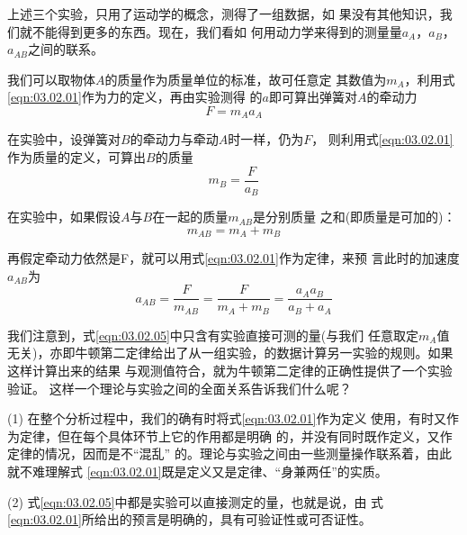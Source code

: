 \documentclass[../outline-of-mechanics.tex]{subfiles}
\begin{document}
上述三个实验，只用了运动学的概念，测得了一组数据，如
果没有其他知识，我们就不能得到更多的东西。现在，我们看如
何用动力学来得到的测量量$ a_A $，$ a_B $，$ a_{AB} $之间的联系。

我们可以取物体$ A $的质量作为质量单位的标准，故可任意定
其数值为$ m_A $，利用式\eqref{eqn:03.02.01}作为力的定义，再由实验测得
的$ a $即可算出弹簧对$ A $的牵动力
\begin{equation}\label{eqn:03.02.02}
  F = m _ { A } a _ { A }
\end{equation}

在实验中，设弹簧对$ B $的牵动力与牵动$ A $时一样，仍为$ F $，
则利用式\eqref{eqn:03.02.01}作为质量的定义，可算出$ B $的质量
\begin{equation}\label{eqn:03.02.03}
  m _ { B } = \frac { F } { a _ { B } }
\end{equation}

在实验中，如果假设$ A $与$ B $在一起的质量$ m_{AB} $是分别质量
之和(即质量是可加的)：
\begin{equation}\label{eqn:03.02.04}
  m _ { A B } = m _ { A } + m _ { B }
\end{equation}

再假定牵动力依然是F，就可以用式\eqref{eqn:03.02.01}作为定律，来预
言此时的加速度$ a_{AB} $为
\begin{equation}\label{eqn:03.02.05}
  a _ { A B } = \frac { F } { m _ { A B } } = \frac { F } { m _ { A } + m _ { B } } = \frac { a _ { A } a _ { B } } { a _ { B } + a _ { A } }
\end{equation}

我们注意到，式\eqref{eqn:03.02.05}中只含有实验直接可测的量(与我们
任意取定$ m_A $值无关)，亦即牛顿第二定律给出了从一组实验\lbr {}，\rbr 的数据计算另一实验\lbr {}\rbr 的规则。如果这样计算出来的结果
与观测值符合，就为牛顿第二定律的正确性提供了一个实验验证。
这样一个理论与实验之间的全面关系告诉我们什么呢？

(1) 在整个分析过程中，我们的确有时将式\eqref{eqn:03.02.01}作为定义
使用，有时又作为定律，但在每个具体环节上它的作用都是明确
的，并没有同时既作定义，又作定律的情况，因而是不“混乱”
的。理论与实验之间由一些测量操作联系着，由此就不难理解式
\eqref{eqn:03.02.01}既是定义又是定律、“身兼两任”的实质。

(2) 式\eqref{eqn:03.02.05}中都是实验可以直接测定的量，也就是说，由
式\\\eqref{eqn:03.02.01}所给出的预言是明确的，具有可验证性或可否证性。
\end{document}
